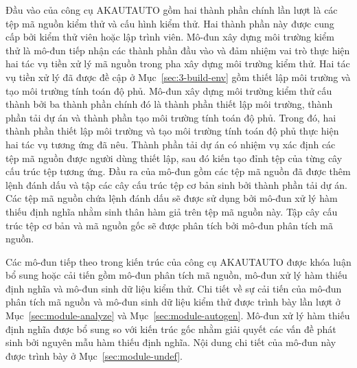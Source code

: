 Đầu vào của công cụ AKAUTAUTO gồm hai thành phần chính lần lượt là các tệp mã nguồn kiểm thử và cấu hình kiểm thử. Hai thành phần này được cung cấp bởi kiểm thử viên hoặc lập trình viên. Mô-đun xây dựng môi trường kiểm thử là mô-đun tiếp nhận các thành phần đầu vào và đảm nhiệm vai trò thực hiện hai tác vụ tiền xử lý mã nguồn trong pha xây dựng môi trường kiểm thử. Hai tác vụ tiền xử lý đã được đề cập ở Mục~\ref{sec:3-build-env} gồm thiết lập môi trường và tạo môi trường tính toán độ phủ. Mô-đun xây dựng môi trường kiểm thử cấu thành bởi ba thành phần chính đó là thành phần thiết lập môi trường, thành phần tải dự án và thành phần tạo môi trường tính toán độ phủ. Trong đó, hai thành phần thiết lập môi trường và tạo môi trường tính toán độ phủ thực hiện hai tác vụ tương ứng đã nêu. Thành phần tải dự án có nhiệm vụ xác định các tệp mã nguồn được người dùng thiết lập, sau đó kiến tạo đỉnh tệp của từng cây cấu trúc tệp tương ứng. Đầu ra của mô-đun gồm các tệp mã nguồn đã được thêm lệnh đánh dấu và tập các cây cấu trúc tệp cơ bản sinh bởi thành phần tải dự án. Các tệp mã nguồn chứa lệnh đánh dấu sẽ được sử dụng bởi mô-đun xử lý hàm thiếu định nghĩa nhằm sinh thân hàm giả trên tệp mã nguồn này. Tập cây cấu trúc tệp cơ bản và mã nguồn gốc sẽ được phân tích bởi mô-đun phân tích mã nguồn.

Các mô-đun tiếp theo trong kiến trúc của công cụ AKAUTAUTO được khóa luận bổ sung hoặc cải tiến gồm mô-đun phân tích mã nguồn, mô-đun xử lý hàm thiếu định nghĩa và mô-đun sinh dữ liệu kiểm thử. Chi tiết về sự cải tiến của mô-đun phân tích mã nguồn và mô-đun sinh dữ liệu kiểm thử được trình bày lần lượt ở Mục~\ref{sec:module-analyze} và Mục~\ref{sec:module-autogen}. Mô-đun xử lý hàm thiếu định nghĩa được bổ sung so với kiến trúc gốc nhằm giải quyết các vấn đề phát sinh bởi nguyên mẫu hàm thiếu định nghĩa. Nội dung chi tiết của mô-đun này được trình bày ở Mục~\ref{sec:module-undef}. 

